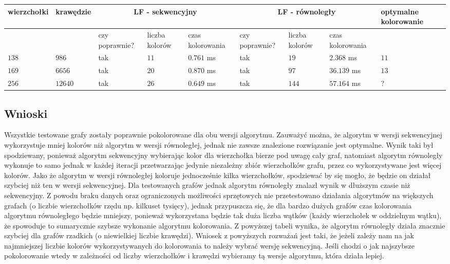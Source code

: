 \documentclass{article}
\begin{document}
	\begin{center}
	\hspace*{-1.5cm}	
	\begin{tabular}{|p{2cm}|p{1.7cm}|p{1.5cm}|p{1.5cm}|p{1.5cm}|p{1.5cm}|p{1.5cm}|p{1.5cm}|p{1.5cm}|} \hline
		\textbf{wierzchołki} & \textbf{krawędzie} & \multicolumn{3}{|c|}{\textbf{LF - sekwencyjny}} & \multicolumn{3}{|c|}{\textbf{LF - równoległy}} & optymalne kolorowanie \\
		\hline
		 & & czy poprawnie? & liczba kolorów & czas kolorowania & czy poprawnie? & liczba kolorów & czas kolorowania & \\
		 \hline
		 $138$ & $986$ & tak & $11$ & $0.761$ ms & tak & $19$ & $2.368$ ms & $11$ \\
		\hline	
		$169$ & $6656$ & tak & $20$ & $0.870$ ms & tak & $97$ & $36.139$ ms & $13$ \\	 
		\hline		
		$256$ & $12640$ & tak & $26$ & $0.649$ ms & tak & $144$ & $57.164$ ms & ? \\
		\hline
	\end{tabular}
	\end{center}
		
	\subsection{Wnioski}
	
	Wszystkie testowane grafy zostały poprawnie pokolorowane dla obu wersji algorytmu. Zauważyć można, że algorytm w wersji sekwencyjnej wykorzystuje mniej kolorów niż algorytm w wersji równoległej, jednak nie zawsze znalezione rozwiązanie jest optymalne. Wynik taki był spodziewany, ponieważ algorytm sekwencyjny wybierając kolor dla wierzchołka bierze pod uwagę cały graf, natomiast algorytm równoległy wykonuje to samo jednak w każdej iteracji przetwarzając jedynie niezależny zbiór wierzchołków grafu, przez co wykorzystywane jest więcej kolorów. Jako że algorytm w wersji równoległej koloruje jednocześnie kilka wierzchołków, spodziewać by się mogło, że będzie on działał szybciej niż ten w wersji sekwencyjnej. Dla testowanych grafów jednak algorytm równoległy znalazł wynik w dłuższym czasie niż sekwencyjny. Z powodu braku danych oraz ograniczonych możliwości sprzętowych nie przetestowano działania algorytmów na większych grafach (o liczbie wierzchołków rzędu np. kilkuset tysięcy), jednak przypuszcza się, że dla bardzo dużych grafów czas kolorowania algorytmu równoległego będzie mniejszy, ponieważ wykorzystana będzie tak duża liczba wątków (każdy wierzchołek w oddzielnym wątku), że spowoduje to sumarycznie szybsze wykonanie algorytmu kolorowania. Z powyższej tabeli wynika, że algorytm równoległy działa znacznie szybciej dla grafów rzadkich (o niewielkiej liczbie krawędzi). Wniosek z powyższych rozważań jest taki, że jeżeli zależy nam na jak najmniejszej liczbie kolorów wykorzystywanych do kolorowania to należy wybrać wersję sekwencyjną. Jeśli chodzi o jak najszybsze pokolorowanie wtedy w zależności od liczby wierzchołków i krawędzi wybieramy tą wersje algorytmu, która działa lepiej.
	
\end{document}
